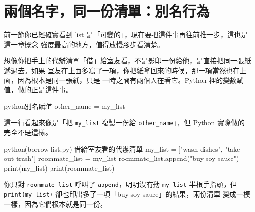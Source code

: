 \section{兩個名字，同一份清單：別名行為}
\label{sec:aliasing}

前一節你已經確實看到 list 是「可變的」，現在要把這件事再往前推一步，這也是這一章概念
強度最高的地方，值得放慢腳步看清楚。

想像你把手上的代辦清單「借」給室友看，不是影印一份給他，是直接把同一張紙遞過去。如果
室友在上面多寫了一項，你把紙拿回來的時候，那一項當然也在上面，因為根本是同一張紙，只是
一時之間有兩個人在看它。Python 裡的變數賦值，做的正是這件事。

\begin{code}{python}{別名賦值}
other_name = my_list
\end{code}

這一行看起來像是「把 \texttt{my\_list} 複製一份給 \texttt{other\_name}」，但 Python
實際做的完全不是這樣。

\begin{example}{python}{(borrow-list.py) 借給室友看的代辦清單}
my_list = ["wash dishes", "take out trash"]
roommate_list = my_list
roommate_list.append("buy soy sauce")
print(my_list)
print(roommate_list)
\end{example}


你只對 \texttt{roommate\_list} 呼叫了 \texttt{append}，明明沒有動 \texttt{my\_list}
半根手指頭，但 \texttt{print(my\_list)} 卻也印出多了一項「buy soy sauce」的結果，兩份清單
變成一模一樣，因為它們根本就是同一份。



